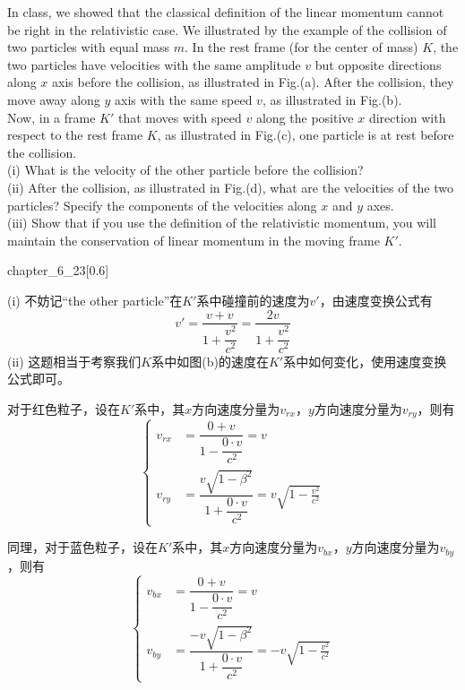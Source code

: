 \begin{solution}
    In class, we showed that the classical definition of the linear
    momentum cannot be right in the relativistic case. We illustrated by the
    example of the collision of two particles with equal mass $m$. In the rest
    frame (for the center of mass) $K$, the two particles have velocities with
    the same amplitude $v$ but opposite directions along $x$ axis before the
    collision, as illustrated in Fig.(a). After the collision, they move away along $y$ axis with the same speed $v$, as illustrated in Fig.(b). \\Now, in a frame $K'$ that moves with speed $v$ along the positive $x$ direction with respect to the rest frame $K$, as illustrated in Fig.(c), one particle is at rest before the
    collision.
    \\(i) What is the velocity of the other particle before the
    collision?
    \\(ii) After the collision, as illustrated in Fig.(d), what are the velocities of
    the two particles? Specify the components of the velocities along $x$ and
    $y$ axes.
    \\(iii) Show that if you use the definition of the relativistic
    momentum, you will maintain the conservation of linear momentum in
    the moving frame $K'$.
    \begin{singlefigure}{chapter_6_23}[0.6]
    \end{singlefigure}

    \tcbrule

    (i) 不妨记``the other particle''在$K'$系中碰撞前的速度为$v'$，由速度变换公式有
    \[v'=\dfrac{v+v}{1+\dfrac{v^{2}}{c^{2}}}=\dfrac{2v}{1+\dfrac{v^{2}}{c^{2}}} \]
    (ii) 这题相当于考察我们$K$系中如图(b)的速度在$K'$系中如何变化，使用速度变换公式即可。

    对于红色粒子，设在$K'$系中，其$x$方向速度分量为$v_{rx}$，$y$方向速度分量为$v_{ry}$，则有
    \[\left\{\begin{aligned}
            v_{rx} & =\dfrac{0+v}{1-\dfrac{0\cdot v}{c^2}}=v                                               \\
            v_{ry} & =\dfrac{v\sqrt{1-\beta^{2}}}{1+\dfrac{0\cdot v}{c^{2}}}=v\sqrt{1-\frac{v^{2}}{c^{2}}}
        \end{aligned}\right.
    \]


    同理，对于蓝色粒子，设在$K'$系中，其$x$方向速度分量为$v_{bx}$，$y$方向速度分量为$v_{by}$，则有
    \[\left\{\begin{aligned}
            v_{bx} & =\dfrac{0+v}{1-\dfrac{0\cdot v}{c^2}}=v                                                 \\
            v_{by} & =\dfrac{-v\sqrt{1-\beta^{2}}}{1+\dfrac{0\cdot v}{c^{2}}}=-v\sqrt{1-\frac{v^{2}}{c^{2}}}
        \end{aligned}\right.
    \]


\end{solution}
